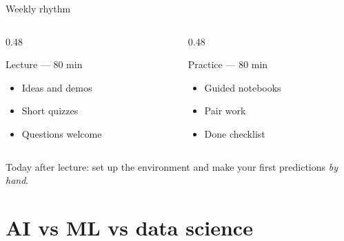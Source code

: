 \documentclass[aspectratio=169,11pt]{beamer}
\begin{document}
    \begin{frame}{Weekly rhythm}
        \begin{columns}[T]
            \begin{column}{0.48\textwidth}
                \begin{block}{Lecture --- 80 min}
                    \begin{itemize}
                        \item Ideas and demos
                        \item Short quizzes
                        \item Questions welcome
                    \end{itemize}
                \end{block}
            \end{column}
            \begin{column}{0.48\textwidth}
                \begin{block}{Practice --- 80 min}
                    \begin{itemize}
                        \item Guided notebooks
                        \item Pair work
                        \item Done checklist
                    \end{itemize}
                \end{block}
            \end{column}
        \end{columns}
        \vspace{0.6em}
        Today after lecture: set up the environment and make your first predictions \emph{by hand}.
    \end{frame}

    \section{AI vs ML vs data science}
\end{document}
